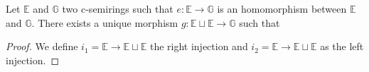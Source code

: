 \begin{theorem}
	Let $\mathbb{E}$ and $\mathbb{G}$ two c-semirings such that $e : \mathbb{E} \rightarrow \mathbb{G} $ is an homomorphism between $ \mathbb{E} $ and $ \mathbb{G} $. There exists a unique morphism $g :  \mathbb{E} \sqcup \mathbb{E} \rightarrow \mathbb{G}$ such that
\end{theorem}

\begin{proof} 
	We define $i_1 = \mathbb{E} \rightarrow \mathbb{E} \sqcup \mathbb{E} $ the right injection and $i_2 = \mathbb{E} \rightarrow \mathbb{E} \sqcup \mathbb{E} $ as the left injection.
\end{proof}

